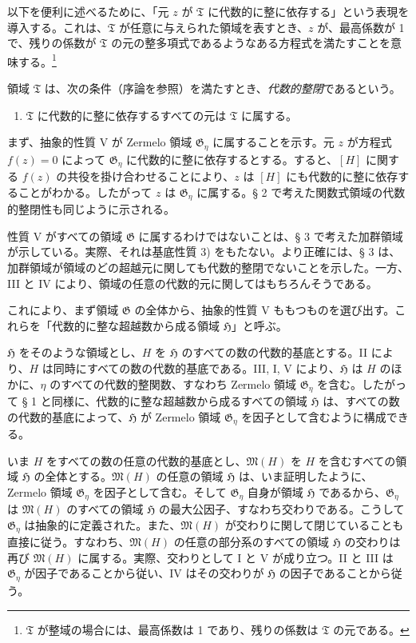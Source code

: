 以下を便利に述べるために、「元 $z$ が $\mathfrak T$ に代数的に整に依存する」という表現を導入する。これは、$\mathfrak T$ が任意に与えられた領域を表すとき、$z$ が、最高係数が 1 で、残りの係数が $\mathfrak T$ の元の整多項式であるようなある方程式を満たすことを意味する。\footnote{$\mathfrak T$ が整域の場合には、最高係数は 1 であり、残りの係数は $\mathfrak T$ の元である。}

領域 $\mathfrak T$ は、次の条件（序論を参照）を満たすとき、\emph{代数的整閉}であるという。
\begin{enumerate}
\item[V.] $\mathfrak T$ に代数的に整に依存するすべての元は $\mathfrak T$ に属する。
\end{enumerate}

まず、抽象的性質 V が Zermelo 領域 $\mathfrak G_\eta$ に属することを示す。元 $z$ が方程式 $f(z)=0$ によって $\mathfrak G_\eta$ に代数的に整に依存するとする。すると、$[H]$ に関する $f(z)$ の共役を掛け合わせることにより、$z$ は $[H]$ にも代数的に整に依存することがわかる。したがって $z$ は $\mathfrak G_\eta$ に属する。§ 2 で考えた関数式領域の代数的整閉性も同じように示される。

性質 V がすべての領域 $\mathfrak G$ に属するわけではないことは、§ 3 で考えた加群領域が示している。実際、それは基底性質 3) をもたない。より正確には、§ 3 は、加群領域が領域のどの超越元に関しても代数的整閉でないことを示した。一方、III と IV により、領域の任意の代数的元に関してはもちろんそうである。

これにより、まず領域 $\mathfrak G$ の全体から、抽象的性質 V ももつものを選び出す。これらを「代数的に整な超越数から成る領域 $\mathfrak H$」と呼ぶ。

$\mathfrak H$ をそのような領域とし、$H$ を $\mathfrak H$ のすべての数の代数的基底とする。II により、$H$ は同時にすべての数の代数的基底である。III, I, V により、$\mathfrak H$ は $H$ のほかに、$\eta$ のすべての代数的整関数、すなわち Zermelo 領域 $\mathfrak G_\eta$ を含む。したがって § 1 と同様に、代数的に整な超越数から成るすべての領域 $\mathfrak H$ は、すべての数の代数的基底によって、$\mathfrak H$ が Zermelo 領域 $\mathfrak G_\eta$ を因子として含むように構成できる。

いま $H$ をすべての数の任意の代数的基底とし、$\mathfrak M(H)$ を $H$ を含むすべての領域 $\mathfrak H$ の全体とする。$\mathfrak M(H)$ の任意の領域 $\mathfrak H$ は、いま証明したように、Zermelo 領域 $\mathfrak G_\eta$ を因子として含む。そして $\mathfrak G_\eta$ 自身が領域 $\mathfrak H$ であるから、$\mathfrak G_\eta$ は $\mathfrak M(H)$ のすべての領域 $\mathfrak H$ の最大公因子、すなわち交わりである。こうして $\mathfrak G_\eta$ は抽象的に定義された。また、$\mathfrak M(H)$ が交わりに関して閉じていることも直接に従う。すなわち、$\mathfrak M(H)$ の任意の部分系のすべての領域 $\mathfrak H$ の交わりは再び $\mathfrak M(H)$ に属する。実際、交わりとして I と V が成り立つ。II と III は $\mathfrak G_\eta$ が因子であることから従い、IV はその交わりが $\mathfrak H$ の因子であることから従う。

